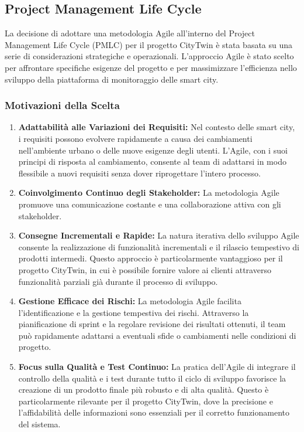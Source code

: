 \subsection{Project Management Life Cycle}

La decisione di adottare una metodologia Agile all'interno del Project Management Life Cycle (PMLC) per il progetto CityTwin è stata basata su una serie di considerazioni strategiche e operazionali. L'approccio Agile è stato scelto per affrontare specifiche esigenze del progetto e per massimizzare l'efficienza nello sviluppo della piattaforma di monitoraggio delle smart city.

\subsubsection{Motivazioni della Scelta}

\begin{enumerate}
    \item \textbf{Adattabilità alle Variazioni dei Requisiti:} Nel contesto delle smart city, i requisiti possono evolvere rapidamente a causa dei cambiamenti nell'ambiente urbano o delle nuove esigenze degli utenti. L'Agile, con i suoi principi di risposta al cambiamento, consente al team di adattarsi in modo flessibile a nuovi requisiti senza dover riprogettare l'intero processo.
    
    \item \textbf{Coinvolgimento Continuo degli Stakeholder:} La metodologia Agile promuove una comunicazione costante e una collaborazione attiva con gli stakeholder.
    
    \item \textbf{Consegne Incrementali e Rapide:} La natura iterativa dello sviluppo Agile consente la realizzazione di funzionalità incrementali e il rilascio tempestivo di prodotti intermedi. Questo approccio è particolarmente vantaggioso per il progetto CityTwin, in cui è possibile fornire valore ai clienti attraverso funzionalità parziali già durante il processo di sviluppo.
    
    \item \textbf{Gestione Efficace dei Rischi:} La metodologia Agile facilita l'identificazione e la gestione tempestiva dei rischi. Attraverso la pianificazione di sprint e la regolare revisione dei risultati ottenuti, il team può rapidamente adattarsi a eventuali sfide o cambiamenti nelle condizioni di progetto.
    
    \item \textbf{Focus sulla Qualità e Test Continuo:} La pratica dell'Agile di integrare il controllo della qualità e i test durante tutto il ciclo di sviluppo favorisce la creazione di un prodotto finale più robusto e di alta qualità. Questo è particolarmente rilevante per il progetto CityTwin, dove la precisione e l'affidabilità delle informazioni sono essenziali per il corretto funzionamento del sistema.
\end{enumerate}

